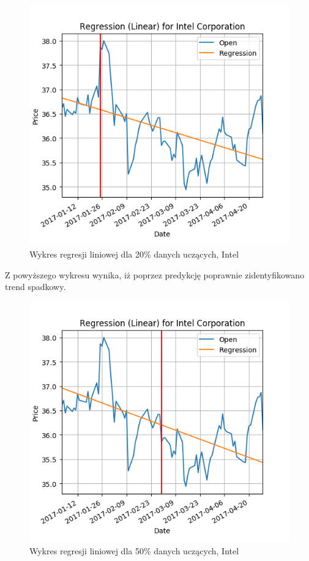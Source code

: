 \begin{figure}[h!]
\centering
\includegraphics[width=150mm]{pictures/plots/intel_linear_20.png}
\caption{Wykres regresji liniowej dla 20\% danych uczących, Intel}
\label{fig:intel_linear_20}
\end{figure}

Z powyższego wykresu wynika, iż poprzez predykcję poprawnie zidentyfikowano trend spadkowy.\\

\begin{figure}[h!]
\centering
\includegraphics[width=150mm]{pictures/plots/intel_linear_50.png}
\caption{Wykres regresji liniowej dla 50\% danych uczących, Intel}
\label{fig:intel_linear_50}
\end{figure}

